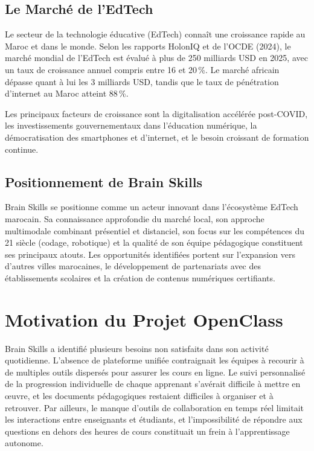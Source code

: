 \documentclass[12pt, a4paper, twoside]{report}
\begin{document}
\subsection{Le Marché de l'EdTech}

Le secteur de la technologie éducative (EdTech) connaît une croissance rapide au
Maroc et dans le monde. Selon les rapports HolonIQ et de l'OCDE (2024), le marché
mondial de l'EdTech est évalué à plus de 250 milliards USD en 2025, avec un taux
de croissance annuel compris entre 16 et 20\,\%. Le marché africain dépasse quant
à lui les 3 milliards USD, tandis que le taux de pénétration d'internet au Maroc
atteint 88\,\%.

Les principaux facteurs de croissance sont la digitalisation accélérée
post-COVID, les investissements gouvernementaux dans l'éducation numérique, la
démocratisation des smartphones et d'internet, et le besoin croissant de
formation continue.

\subsection{Positionnement de Brain Skills}

Brain Skills se positionne comme un acteur innovant dans l'écosystème EdTech
marocain. Sa connaissance approfondie du marché local, son approche multimodale
combinant présentiel et distanciel, son focus sur les compétences du
21\ieme{} siècle (codage, robotique) et la qualité de son équipe pédagogique
constituent ses principaux atouts. Les opportunités identifiées portent sur
l'expansion vers d'autres villes marocaines, le développement de partenariats avec
des établissements scolaires et la création de contenus numériques certifiants.

\section{Motivation du Projet OpenClass}

Brain Skills a identifié plusieurs besoins non satisfaits dans son activité
quotidienne. L'absence de plateforme unifiée contraignait les équipes à recourir
à de multiples outils dispersés pour assurer les cours en ligne. Le suivi
personnalisé de la progression individuelle de chaque apprenant s'avérait difficile
à mettre en œuvre, et les documents pédagogiques restaient difficiles à organiser
et à retrouver. Par ailleurs, le manque d'outils de collaboration en temps réel
limitait les interactions entre enseignants et étudiants, et l'impossibilité de
répondre aux questions en dehors des heures de cours constituait un frein à
l'apprentissage autonome.
\end{document}
